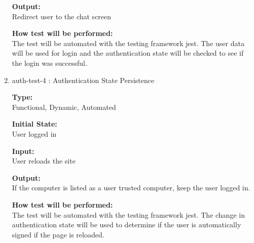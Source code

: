 \documentclass[12pt, titlepage]{article}
\begin{document}
\begin{enumerate}
\textbf{Output:}\\ Redirect user to the chat screen
					
\textbf{How test will be performed:}\\ 
The test will be automated with the testing framework jest. The user data will be used for login and the authentication state will be checked to see if the login was successful.

\item{auth-test-4 : Authentication State Persistence\\}

\textbf{Type:}\\ Functional, Dynamic, Automated 
					
\textbf{Initial State:}\\ User logged in
					
\textbf{Input:}\\ User reloads the site
					
\textbf{Output:}\\ If the computer is listed as a user trusted computer, keep the user logged in.
					
\textbf{How test will be performed:}\\ 
The test will be automated with the testing framework jest. The change in authentication state will be used to determine if the user is automatically signed if the page is reloaded.


\end{enumerate} 
\end{document}
